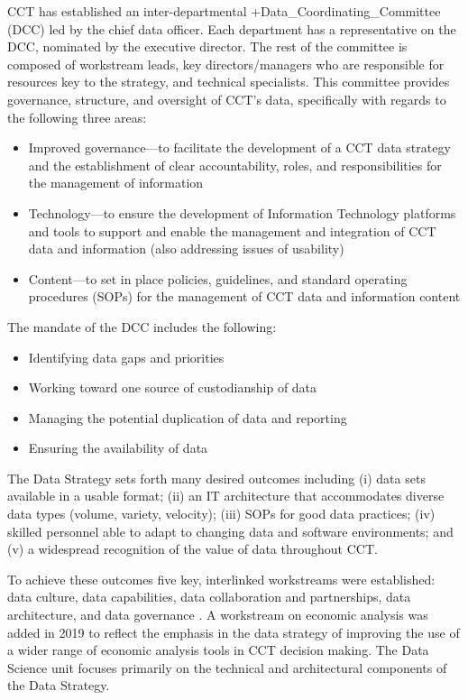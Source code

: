 \documentclass[
]{book}
\providecommand{\tightlist}{%
  \setlength{\itemsep}{0pt}\setlength{\parskip}{0pt}}
\begin{document}
CCT has established an inter-departmental +Data\_Coordinating\_Committee\textbar{} (DCC) led by the chief data officer. Each department has a representative on the DCC, nominated by the executive director. The rest of the committee is composed of workstream leads, key directors/managers who are responsible for resources key to the strategy, and technical specialists. This committee provides governance, structure, and oversight of CCT's data, specifically with regards to the following three areas:

\begin{itemize}
\tightlist
\item
  Improved governance---to facilitate the development of a CCT data strategy and the establishment of clear accountability, roles, and responsibilities for the management of information
\item
  Technology---to ensure the development of Information Technology platforms and tools to support and enable the management and integration of CCT data and information (also addressing issues of usability)
\item
  Content---to set in place policies, guidelines, and standard operating procedures (SOPs) for the management of CCT data and information content \citep{cityofcapetown2018}
\end{itemize}

The mandate of the DCC includes the following:

\begin{itemize}
\tightlist
\item
  Identifying data gaps and priorities
\item
  Working toward one source of custodianship of data
\item
  Managing the potential duplication of data and reporting
\item
  Ensuring the availability of data
\end{itemize}

The Data Strategy sets forth many desired outcomes including (i) data sets available in a usable format; (ii) an IT architecture that accommodates diverse data types (volume, variety, velocity); (iii) SOPs for good data practices; (iv) skilled personnel able to adapt to changing data and software environments; and (v) a widespread recognition of the value of data throughout CCT.

To achieve these outcomes five key, interlinked workstreams were established: data culture, data capabilities, data collaboration and partnerships, data architecture, and data governance \citep{cityofcapetown2018}. A workstream on economic analysis was added in 2019 to reflect the emphasis in the data strategy of improving the use of a wider range of economic analysis tools in CCT decision making. The Data Science unit focuses primarily on the technical and architectural components of the Data Strategy.
\end{document}
